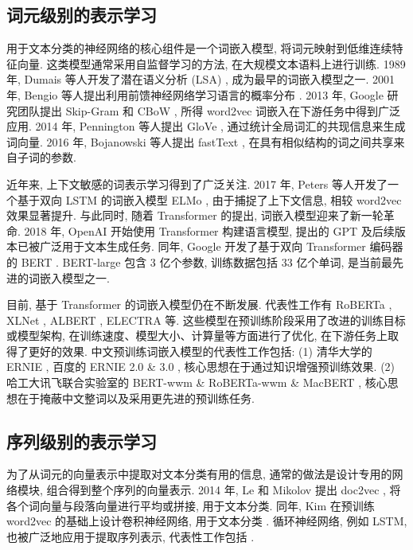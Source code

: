\documentclass[12pt,a4paper]{article}
\begin{document}
\subsection{词元级别的表示学习}

用于文本分类的神经网络的核心组件是一个词嵌入模型, 将词元映射到低维连续特征向量. 这类模型通常采用自监督学习的方法, 在大规模文本语料上进行训练. 1989 年, Dumais 等人开发了潜在语义分析 (LSA) \cite{dumais_latent_2004}, 成为最早的词嵌入模型之一. 2001 年, Bengio 等人提出利用前馈神经网络学习语言的概率分布 \cite{bengio_neural_2003}. 2013 年, Google 研究团队提出 Skip-Gram \cite{mikolov_distributed_2013} 和 CBoW \cite{mikolov_efficient_2013}, 所得 word2vec 词嵌入在下游任务中得到广泛应用. 2014 年, Pennington 等人提出 GloVe \cite{pennington_glove_2014}, 通过统计全局词汇的共现信息来生成词向量. 2016 年, Bojanowski 等人提出 fastText \cite{bojanowski_enriching_2017}, 在具有相似结构的词之间共享来自子词的参数.

近年来, 上下文敏感的词表示学习得到了广泛关注. 2017 年, Peters 等人开发了一个基于双向 LSTM 的词嵌入模型 ELMo \cite{peters_deep_2018}, 由于捕捉了上下文信息, 相较 word2vec 效果显著提升. 与此同时, 随着 Transformer \cite{vaswani_attention_2017} 的提出, 词嵌入模型迎来了新一轮革命. 2018 年, OpenAI 开始使用 Transformer 构建语言模型, 提出的 GPT \cite{radford_improving_2018} 及后续版本已被广泛用于文本生成任务. 同年, Google 开发了基于双向 Transformer 编码器的 BERT \cite{devlin_bert_2019}. BERT-large 包含 3 亿个参数, 训练数据包括 33 亿个单词, 是当前最先进的词嵌入模型之一.

目前, 基于 Transformer 的词嵌入模型仍在不断发展. 代表性工作有 RoBERTa \cite{liu_roberta_2019}, XLNet \cite{yang_xlnet_2020}, ALBERT \cite{lan_albert_2020}, ELECTRA \cite{clark_electra_2020} 等. 这些模型在预训练阶段采用了改进的训练目标或模型架构, 在训练速度、模型大小、计算量等方面进行了优化, 在下游任务上取得了更好的效果. 中文预训练词嵌入模型的代表性工作包括: (1) 清华大学的 ERNIE \cite{zhang_ernie_2019}, 百度的 ERNIE 2.0 \cite{sun_ernie_2019} \& 3.0 \cite{sun_ernie_2021}, 核心思想在于通过知识增强预训练效果. (2) 哈工大讯飞联合实验室的 BERT-wwm \& RoBERTa-wwm \& MacBERT \cite{cui_revisiting_2020,cui_pre-training_2021}, 核心思想在于掩蔽中文整词以及采用更先进的预训练任务.

\subsection{序列级别的表示学习}

为了从词元的向量表示中提取对文本分类有用的信息, 通常的做法是设计专用的网络模块, 组合得到整个序列的向量表示. 2014 年, Le 和 Mikolov 提出 doc2vec \cite{le_distributed_2014}, 将各个词向量与段落向量进行平均或拼接, 用于文本分类. 同年, Kim 在预训练 word2vec 的基础上设计卷积神经网络, 用于文本分类 \cite{kim_convolutional_2014}. 循环神经网络, 例如 LSTM, 也被广泛地应用于提取序列表示, 代表性工作包括 \cite{cheng_long_2016}.
\end{document}
